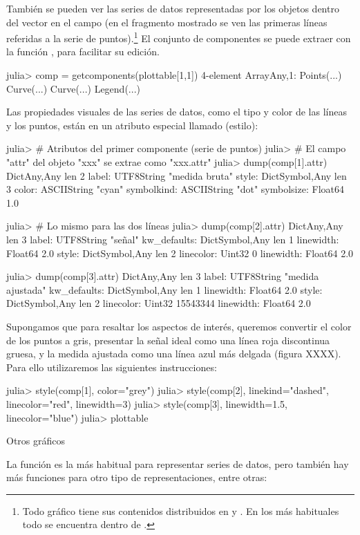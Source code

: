 ﻿\documentclass[spanish]{article}
\begin{document}
También se pueden ver las series de datos representadas por los objetos
dentro del vector  en el campo  (en el
fragmento mostrado se ven las primeras líneas referidas a la serie de puntos).\footnote{%
Todo gráfico tiene sus contenidos distribuidos en  y
. En los más habituales todo se encuentra dentro de
.}%
El conjunto de componentes se puede extraer con la función ,
para facilitar su edición.

julia> comp = getcomponents(plottable[1,1])
4-element Array{Any,1}:
 Points(...)
 Curve(...) 
 Curve(...) 
 Legend(...)

Las propiedades visuales de las series de datos, como el tipo y color de las
líneas y los puntos, están en un atributo especial llamado 
(estilo):

julia> # Atributos del primer componente (serie de puntos)
julia> # El campo "attr" del objeto "xxx" se extrae como "xxx.attr"
julia> dump(comp[1].attr)
Dict{Any,Any} len 2
  label: UTF8String "medida bruta"
  style: Dict{Symbol,Any} len 3
    color: ASCIIString "cyan"
    symbolkind: ASCIIString "dot"
    symbolsize: Float64 1.0

julia> # Lo mismo para las dos líneas
julia> dump(comp[2].attr)
Dict{Any,Any} len 3
  label: UTF8String "señal"
  kw_defaults: Dict{Symbol,Any} len 1
    linewidth: Float64 2.0
  style: Dict{Symbol,Any} len 2
    linecolor: Uint32 0
    linewidth: Float64 2.0

julia> dump(comp[3].attr)
Dict{Any,Any} len 3
  label: UTF8String "medida ajustada"
  kw_defaults: Dict{Symbol,Any} len 1
    linewidth: Float64 2.0
  style: Dict{Symbol,Any} len 2
    linecolor: Uint32 15543344
    linewidth: Float64 2.0

Supongamos que para resaltar los aspectos de interés,
queremos convertir el color de los puntos a gris, 
presentar la señal ideal como una línea roja discontinua gruesa,
y la medida ajustada como una línea azul más delgada (figura XXXX).
Para ello utilizaremos las siguientes instrucciones:

julia> style(comp[1], color="grey")
julia> style(comp[2], linekind="dashed", linecolor="red", linewidth=3)
julia> style(comp[3], linewidth=1.5, linecolor="blue")
julia> plottable

Otros gráficos

La función  es la más habitual para representar series de datos,
pero también hay más funciones para otro tipo de representaciones, entre otras:
\end{document}
